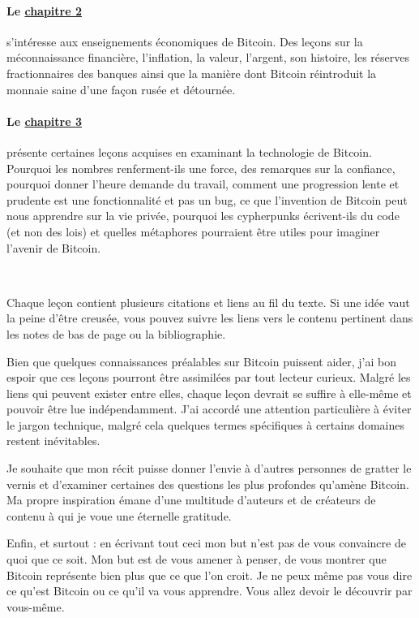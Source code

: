 \paragraph{Le \hyperref[ch:economics]{chapitre 2}}{ s'intéresse aux enseignements
économiques de Bitcoin. Des leçons sur la méconnaissance financière,
l'inflation, la valeur, l'argent, son histoire, les réserves fractionnaires
des banques ainsi que la manière dont Bitcoin réintroduit la monnaie saine d'une
façon rusée et détournée.}

\paragraph{Le \hyperref[ch:technology]{chapitre 3}}{ présente certaines leçons
acquises en examinant la technologie de Bitcoin. Pourquoi les nombres
renferment-ils une force, des remarques sur la confiance, pourquoi donner
l'heure demande du travail, comment une progression lente et prudente est une
fonctionnalité et pas un bug, ce que l'invention de Bitcoin peut nous apprendre
sur la vie privée, pourquoi les cypherpunks écrivent-ils du code (et non des
lois) et quelles métaphores pourraient être utiles pour imaginer l'avenir de
Bitcoin.}

~

Chaque leçon contient plusieurs citations et liens au fil du texte. Si une idée
vaut la peine d'être creusée, vous pouvez suivre les liens vers le contenu
pertinent dans les notes de bas de page ou la bibliographie.

Bien que quelques connaissances préalables sur Bitcoin puissent aider, j'ai bon
espoir que ces leçons pourront être assimilées par tout lecteur curieux. Malgré
les liens qui peuvent exister entre elles, chaque leçon devrait se suffire à
elle-même et pouvoir être lue indépendamment. J'ai accordé une attention
particulière à éviter le jargon technique, malgré cela quelques termes
spécifiques à certains domaines restent inévitables.

Je souhaite que mon récit puisse donner l'envie à d'autres personnes de gratter
le vernis et d'examiner certaines des questions les plus profondes qu'amène
Bitcoin. Ma propre inspiration émane d'une multitude d'auteurs et de créateurs
de contenu à qui je voue une éternelle gratitude.

Enfin, et surtout : en écrivant tout ceci mon but n'est pas de vous convaincre
de quoi que ce soit. Mon but est de vous amener à penser, de vous montrer que
Bitcoin représente bien plus que ce que l'on croit. Je ne peux même pas vous
dire ce qu'est Bitcoin ou ce qu'il va vous apprendre. Vous allez devoir le
découvrir par vous-même.

